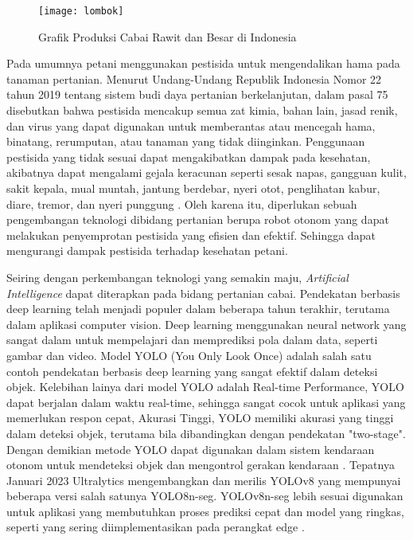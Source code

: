 \begin{figure}[H]
	\centering
	\texttt{[image: lombok]}
	\caption{Grafik Produksi Cabai Rawit dan Besar di Indonesia}
	\label{fig:grafik-lombok}
\end{figure}

Pada umumnya petani menggunakan pestisida untuk mengendalikan hama pada tanaman pertanian. Menurut Undang-Undang Republik Indonesia Nomor 22 tahun 2019 tentang sistem budi daya pertanian berkelanjutan, dalam pasal 75 disebutkan bahwa pestisida mencakup semua zat kimia, bahan lain, jasad renik, dan virus yang dapat digunakan untuk memberantas atau mencegah hama, binatang, rerumputan, atau tanaman yang tidak diinginkan. Penggunaan pestisida yang tidak sesuai dapat mengakibatkan dampak pada kesehatan, akibatnya dapat mengalami gejala keracunan seperti sesak napas, gangguan kulit, sakit kepala, mual muntah, jantung berdebar, nyeri otot, penglihatan kabur, diare, tremor, dan nyeri punggung \cite{ibrahim2022identifikasi}. Oleh karena itu, diperlukan sebuah pengembangan teknologi dibidang pertanian berupa robot otonom yang dapat melakukan penyemprotan pestisida yang efisien dan efektif. Sehingga dapat mengurangi dampak pestisida terhadap kesehatan petani.

Seiring dengan perkembangan teknologi yang semakin maju, \textit{Artificial Intelligence}  dapat diterapkan pada bidang pertanian cabai. Pendekatan berbasis deep learning telah menjadi populer dalam beberapa tahun terakhir, terutama dalam aplikasi computer vision. Deep learning menggunakan neural network yang sangat dalam untuk mempelajari dan memprediksi pola dalam data, seperti gambar dan video. Model YOLO (You Only Look Once) adalah salah satu contoh pendekatan berbasis deep learning yang sangat efektif dalam deteksi objek. Kelebihan lainya dari model YOLO adalah Real-time Performance, YOLO dapat berjalan dalam waktu real-time, sehingga sangat cocok untuk aplikasi yang memerlukan respon cepat, Akurasi Tinggi, YOLO memiliki akurasi yang tinggi dalam deteksi objek, terutama bila dibandingkan dengan pendekatan "two-stage". Dengan demikian metode YOLO dapat digunakan dalam sistem kendaraan otonom untuk mendeteksi objek dan mengontrol gerakan kendaraan \cite{sirisha2023statistical}. Tepatnya Januari 2023 Ultralytics mengembangkan dan merilis YOLOv8 yang mempunyai beberapa versi salah satunya YOLO8n-seg. YOLOv8n-seg lebih sesuai digunakan untuk aplikasi yang membutuhkan proses prediksi cepat dan model yang ringkas, seperti yang sering diimplementasikan pada perangkat edge \cite{10348569}.

